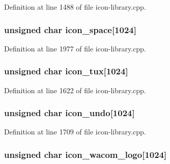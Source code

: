 Definition at line 1488 of file icon-\/library.cpp.

\hypertarget{icon-library_8cpp_a96b0ba8ae40eabbcfab2b19f72b07042}{
\subsubsection[{icon\_\-space}]{\setlength{\rightskip}{0pt plus 5cm}unsigned char {\bf icon\_\-space}\mbox{[}1024\mbox{]}}}
\label{icon-library_8cpp_a96b0ba8ae40eabbcfab2b19f72b07042}


Definition at line 1977 of file icon-\/library.cpp.

\hypertarget{icon-library_8cpp_af1dfdb4c15f06e3a04d0bbebd33003f2}{
\subsubsection[{icon\_\-tux}]{\setlength{\rightskip}{0pt plus 5cm}unsigned char {\bf icon\_\-tux}\mbox{[}1024\mbox{]}}}
\label{icon-library_8cpp_af1dfdb4c15f06e3a04d0bbebd33003f2}


Definition at line 1622 of file icon-\/library.cpp.

\hypertarget{icon-library_8cpp_a0d47abd07a52538f30d92d7605774894}{
\subsubsection[{icon\_\-undo}]{\setlength{\rightskip}{0pt plus 5cm}unsigned char {\bf icon\_\-undo}\mbox{[}1024\mbox{]}}}
\label{icon-library_8cpp_a0d47abd07a52538f30d92d7605774894}


Definition at line 1709 of file icon-\/library.cpp.

\hypertarget{icon-library_8cpp_a943110285793a4d3d423f7ec88a6e5b1}{
\subsubsection[{icon\_\-wacom\_\-logo}]{\setlength{\rightskip}{0pt plus 5cm}unsigned char {\bf icon\_\-wacom\_\-logo}\mbox{[}1024\mbox{]}}}
\label{icon-library_8cpp_a943110285793a4d3d423f7ec88a6e5b1}


